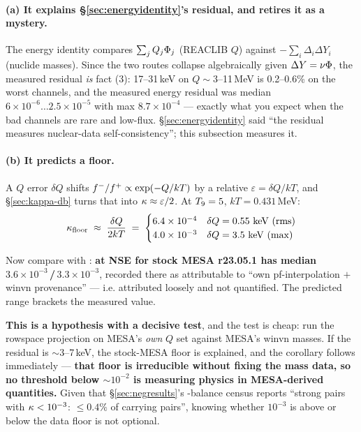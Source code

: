 \paragraph{(a) It explains \S\ref{sec:energyidentity}'s residual, and retires it
as a mystery.} The energy identity compares $\sum_j Q_j\Phi_j$ (REACLIB $Q$)
against $-\sum_i \Delta_i\Delta Y_i$ (nuclide masses). Since the two routes
collapse algebraically given $\Delta Y = \nu\Phi$, the measured residual
\emph{is} fact (3): 17--31\,keV on $Q \sim 3$--11\,MeV is 0.2--0.6\% on the
worst channels, and the measured energy residual was median
$6\times10^{-6}\ldots2.5\times10^{-5}$ with max $8.7\times10^{-4}$ --- exactly
what you expect when the bad channels are rare and low-flux.
\S\ref{sec:energyidentity} said ``the residual measures nuclear-data
self-consistency''; this subsection measures it.

\paragraph{(b) It predicts a \kap{} floor.} A $Q$ error $\delta Q$ shifts
$f^{-}/f^{+} \propto \exp(-Q/kT)$ by a relative $\varepsilon = \delta Q/kT$, and
\S\ref{sec:kappa-db} turns that into $\kappa \approx \varepsilon/2$. At
$T_{9} = 5$, $kT = 0.431$\,MeV:
%
\begin{equation}
\kappa_{\mathrm{floor}} \;\approx\; \frac{\delta Q}{2kT}
\;=\; \begin{cases}
  6.4\times10^{-4} & \delta Q = 0.55\ \text{keV (rms)}\\
  4.0\times10^{-3} & \delta Q = 3.5\ \text{keV (max)}\end{cases}
\label{eq:kappafloor}
\end{equation}
\derivedhere

Now compare with : \textbf{\kap{} at NSE for stock MESA
r23.05.1 has median $3.6\times10^{-3}$\,/\,$3.3\times10^{-3}$}, recorded there
as attributable to ``own pf-interpolation $+$ winvn provenance'' --- i.e.
attributed loosely and not quantified. The predicted range brackets the measured
value.

\begin{result}
\textbf{This is a hypothesis with a decisive test}, and the test is cheap: run
the rowspace projection on MESA's \emph{own} $Q$ set against MESA's winvn
masses. If the residual is ${\sim}3$--7\,keV, the stock-MESA \kap{} floor is
explained, and the corollary follows immediately --- \textbf{that floor is
irreducible without fixing the mass data, so no \kap{} threshold below
${\sim}10^{-2}$ is measuring physics in MESA-derived quantities.} Given that
\S\ref{sec:negresults}'s \kap-balance census reports ``strong pairs with
$\kappa < 10^{-3}$: $\le 0.4\%$ of carrying pairs'', knowing whether $10^{-3}$ is
above or below the data floor is not optional.
\end{result}

